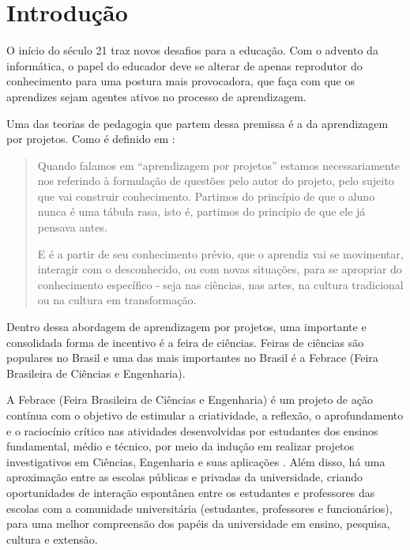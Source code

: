 
\chapter{Introdução}

O início do século 21 traz novos desafios para a educação. Com o advento da informática, o papel do educador deve se alterar de apenas reprodutor do conhecimento para uma postura mais provocadora, que faça com que os aprendizes sejam agentes ativos no processo de aprendizagem. 

Uma das teorias de pedagogia que partem dessa premissa é a da aprendizagem por projetos. Como é definido em :

\begin{quotation}
    Quando falamos em “aprendizagem por projetos” estamos necessariamente nos referindo à formulação de questões pelo autor do projeto, pelo sujeito que vai construir conhecimento. Partimos do princípio de que o aluno nunca é uma tábula rasa, isto é, partimos do princípio de que ele já pensava antes.

    E é a partir de seu conhecimento prévio, que o aprendiz vai se movimentar, interagir com o desconhecido, ou com novas situações, para se apropriar do conhecimento específico - seja nas ciências, nas artes, na cultura tradicional ou na cultura em transformação.
\end{quotation}

Dentro dessa abordagem de aprendizagem por projetos, uma importante e consolidada forma de incentivo é a feira de ciências. Feiras de ciências são populares no Brasil e uma das mais importantes no Brasil é a Febrace (Feira Brasileira de Ciências e Engenharia).

A Febrace (Feira Brasileira de Ciências e Engenharia) é um projeto de ação contínua com o objetivo de estimular a criatividade, a reflexão, o aprofundamento e o raciocínio crítico nas atividades desenvolvidas por estudantes dos ensinos fundamental, médio e técnico, por meio da indução em realizar projetos investigativos em Ciências, Engenharia e suas aplicações \cite{lopes07}. Além disso, há uma aproximação entre as escolas públicas e privadas da universidade, criando oportunidades de interação espontânea entre os estudantes e professores das escolas com a comunidade universitária (estudantes, professores e funcionários), para uma melhor compreensão dos papéis da universidade em ensino, pesquisa, cultura e extensão. 


